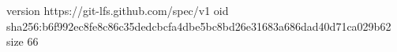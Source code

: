 version https://git-lfs.github.com/spec/v1
oid sha256:b6f992ec8fe8c86c35dedcbcfa4dbe5bc8bd26e31683a686dad40d71ca029b62
size 66
